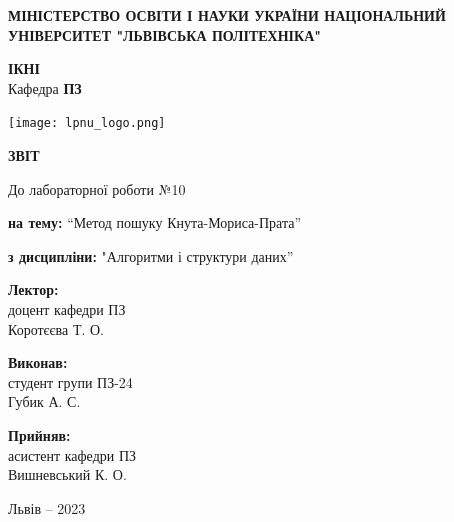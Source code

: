 \documentclass[12pt]{extarticle}
\begin{document}
\begin{titlepage}
    \begin{center}
        \textbf{\normalsize{\MakeUppercase{
            Міністерство Освіти і науки України
            Національний університет "Львівська політехніка"
        }}}

        \begin{flushright}
        \textbf{ІКНІ}\\
        Кафедра \textbf{ПЗ}
        \end{flushright}
        \vspace{15mm}

        \texttt{[image: lpnu\_logo.png]}

        \vspace*{\fill}

        \textbf{\normalsize{\MakeUppercase{Звіт}}}
            
        До лабораторної роботи №10

        \textbf{на тему:} “Метод пошуку Кнута-Мориса-Прата”

        \textbf{з дисципліни:} "Алгоритми і структури даних”
            
        \vspace*{\fill}

        \begin{flushright}

            \textbf{Лектор:}\\
            доцент кафедри ПЗ\\
            Коротєєва Т. О.\\
            \vspace{12pt}

            \textbf{Виконав:}\\
            студент групи ПЗ-24\\
            Губик А. С.\\
            \vspace{12pt}

            \textbf{Прийняв:}\\
            асистент кафедри ПЗ\\
            Вишневський К. О.\\
        \vspace{12pt}
        \end{flushright}

        Львів -- 2023
            
            
    \end{center}
\end{titlepage}
\end{document}

